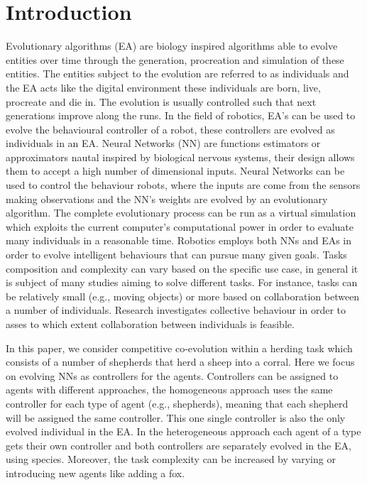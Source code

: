 \documentclass[conference]{IEEEtran}
\begin{document}
\section{Introduction}
Evolutionary algorithms (EA) are biology inspired algorithms able to evolve entities over time through the generation, procreation and simulation of these entities. The entities subject to the evolution are referred to as individuals and the EA acts like the digital environment these individuals are born, live, procreate and die in.
The evolution is usually controlled such that next generations improve along the runs.
In the field of robotics, EA's can be used to evolve the behavioural controller of a robot, these controllers are evolved as individuals in an EA.
Neural Networks (NN) are functions estimators or approximators nautal inspired by biological nervous systems, their design allows them to accept a high number of dimensional inputs.   
Neural Networks can be used to control the behaviour robots, where the inputs are come from the sensors making observations and the NN's weights are evolved by an evolutionary algorithm.
The complete evolutionary process can be run as a virtual simulation which exploits the current computer's computational power in order to evaluate many individuals in a reasonable time.
Robotics employs both NNs and EAs in order to evolve intelligent behaviours that can pursue many given goals.
Tasks composition and complexity can vary based on the specific use case, in general it is subject of many studies aiming to solve different tasks.
For instance, tasks can be relatively small (e.g., moving objects) or more based on collaboration between a number of individuals.
Research investigates collective behaviour in order to asses to which extent collaboration between individuals is feasible.  

In this paper, we consider competitive co-evolution within a herding task which consists of a number of shepherds that herd a sheep into a corral.
Here we focus on evolving NNs as controllers for the agents.
Controllers can be assigned to agents with different approaches, the homogeneous approach uses the same controller for each type of agent (e.g., shepherds), meaning that each shepherd will be assigned the same controller. This one single controller is also the only evolved individual in the EA. In the heterogeneous approach each agent of a type gets their own controller and both controllers are separately evolved in the EA, using species.
Moreover, the task complexity can be increased by varying or introducing new agents like adding a fox.
\end{document}
